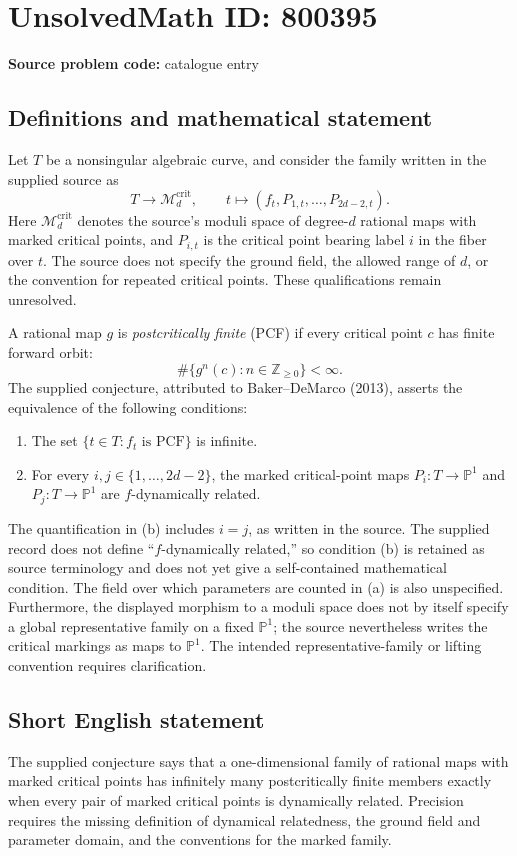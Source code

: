 \documentclass[11pt]{article}
\newcommand{\Z}{\mathbb{Z}}
\newcommand{\PP}{\mathbb{P}}
\begin{document}
\section*{UnsolvedMath ID: 800395}
\textbf{Source problem code:} catalogue entry
\subsection{Definitions and mathematical statement}
Let \(T\) be a nonsingular algebraic curve, and consider the family written in the supplied source as
\[
T\longrightarrow\mathcal M_d^{\mathrm{crit}},\qquad t\longmapsto(f_t,P_{1,t},\ldots,P_{2d-2,t}).
\]
Here \(\mathcal M_d^{\mathrm{crit}}\) denotes the source's moduli space of degree-\(d\) rational maps with marked critical points, and \(P_{i,t}\) is the critical point bearing label \(i\) in the fiber over \(t\). The source does not specify the ground field, the allowed range of \(d\), or the convention for repeated critical points. These qualifications remain unresolved.

A rational map \(g\) is \emph{postcritically finite} (PCF) if every critical point \(c\) has finite forward orbit:
\[
\#\{g^n(c):n\in\Z_{\geq0}\}<\infty.
\]
The supplied conjecture, attributed to Baker--DeMarco (2013), asserts the equivalence of the following conditions:
\begin{enumerate}
\item[(a)] The set \(\{t\in T:f_t\text{ is PCF}\}\) is infinite.
\item[(b)] For every \(i,j\in\{1,\ldots,2d-2\}\), the marked critical-point maps \(P_i:T\to\PP^1\) and \(P_j:T\to\PP^1\) are \(f\)-dynamically related.
\end{enumerate}
The quantification in (b) includes \(i=j\), as written in the source. The supplied record does not define ``\(f\)-dynamically related,'' so condition (b) is retained as source terminology and does not yet give a self-contained mathematical condition. The field over which parameters are counted in (a) is also unspecified. Furthermore, the displayed morphism to a moduli space does not by itself specify a global representative family on a fixed \(\PP^1\); the source nevertheless writes the critical markings as maps to \(\PP^1\). The intended representative-family or lifting convention requires clarification.
\subsection{Short English statement}
The supplied conjecture says that a one-dimensional family of rational maps with marked critical points has infinitely many postcritically finite members exactly when every pair of marked critical points is dynamically related. Precision requires the missing definition of dynamical relatedness, the ground field and parameter domain, and the conventions for the marked family.
\end{document}
